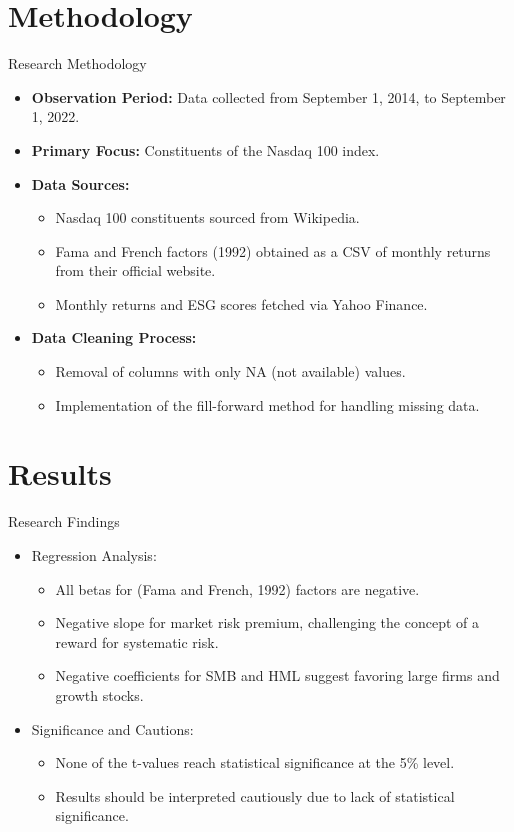 \documentclass{beamer}
\begin{document}
\section{Methodology}
\begin{frame}{Research Methodology}
  \begin{itemize}
    \item \textbf{Observation Period:} Data collected from September 1, 2014, to September 1, 2022.
    \item \textbf{Primary Focus:} Constituents of the Nasdaq 100 index.
    \item \textbf{Data Sources:}
      \begin{itemize}
        \item Nasdaq 100 constituents sourced from Wikipedia.
        \item Fama and French factors (1992) obtained as a CSV of monthly returns from their official website.
        \item Monthly returns and ESG scores fetched via Yahoo Finance.
      \end{itemize}
    \item \textbf{Data Cleaning Process:}
      \begin{itemize}
        \item Removal of columns with only NA (not available) values.
        \item Implementation of the fill-forward method for handling missing data.
      \end{itemize}
  \end{itemize}
\end{frame}

\section{Results}
\begin{frame}{Research Findings}
  \begin{itemize}
    \item Regression Analysis:
      \begin{itemize}
        \item All betas for (Fama and French, 1992) factors are negative.
        \item Negative slope for market risk premium, challenging the concept of a reward for systematic risk.
        \item Negative coefficients for SMB and HML suggest favoring large firms and growth stocks.
      \end{itemize}
    \item Significance and Cautions:
      \begin{itemize}
        \item None of the t-values reach statistical significance at the 5\% level.
        \item Results should be interpreted cautiously due to lack of statistical significance.
      \end{itemize}
  \end{itemize}
\end{frame}
\end{document}
